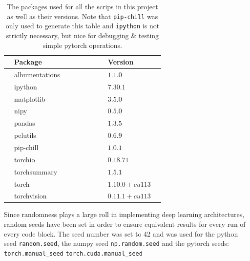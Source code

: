 \documentclass[12pt, fleqn, titlepage]{article}
\newcommand{\1}[1]{\mathds{1}\left[#1\right]}
\begin{document}
\begin{table}[H]
	\begin{center}
		\begin{tabular}{l l l l l l l l l l}
			\toprule			
			
			& \textbf{Package \cite{python_packages}}      & & & & & & & \textbf{Version}  & \\ \midrule
			& albumentations \cite{albumentations}         & & & & & & & $1.1.0$           & \\ 
			& ipython \cite{ipython}                       & & & & & & & $7.30.1$          & \\ 
			& matplotlib \cite{matplotlib}                 & & & & & & & $3.5.0$           & \\ 
			& nipy \cite{nipy}                             & & & & & & & $0.5.0$           & \\
			& pandas \cite{pandas}                         & & & & & & & $1.3.5$           & \\
			& pelutils \cite{pelutils}                     & & & & & & & $0.6.9$           & \\
			& pip-chill \cite{pip-chill}                   & & & & & & & $1.0.1$           & \\
			& torchio \cite{torchio}                       & & & & & & & $0.18.71$         & \\
			& torchsummary \cite{torchsummary}             & & & & & & & $1.5.1$           & \\
			& torch \cite{pytorch}                         & & & & & & & $1.10.0+cu113$    & \\
			& torchvision \cite{torchvision}               & & & & & & & $0.11.1+cu113$    & \\
			\bottomrule
		\end{tabular}
		\caption{The packages used for all the scrips in this project as well as their versions. Note that \texttt{pip-chill} was only used to generate this table and \texttt{ipython} is not strictly necessary, but nice for debugging \& testing simple pytorch operations.}
		\label{tab:packages}
	\end{center}
\end{table}
\noindent Since randomness plays a large roll in implementing deep learning architectures, random seeds have been set in order to ensure equivalent results for every run of every code block. The seed number was set to 42 and was used for the python seed \texttt{random.seed}, the numpy seed \texttt{np.random.seed} and the pytorch seeds: \newline \texttt{torch.manual\_seed} \texttt{torch.cuda.manual\_seed}
\end{document}
